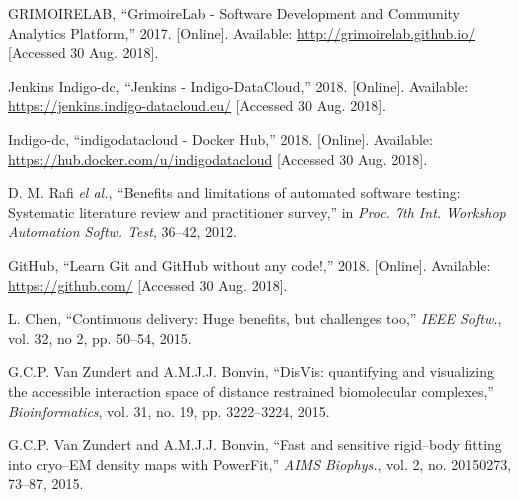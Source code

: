 \documentclass[journal]{IEEEtran}
\begin{document}
\begin{thebibliography}{1}
GRIMOIRELAB, ``GrimoireLab - Software Development and Community Analytics Platform,''
2017.
[Online]. Available: \url{http://grimoirelab.github.io/}
[Accessed 30 Aug. 2018].

Jenkins Indigo-dc, ``Jenkins - Indigo-DataCloud,''
2018.
[Online]. Available: \url{https://jenkins.indigo-datacloud.eu/}
[Accessed 30 Aug. 2018].

Indigo-dc, ``indigodatacloud - Docker Hub,''
2018.
[Online]. Available: \url{https://hub.docker.com/u/indigodatacloud}
[Accessed 30 Aug. 2018].

D. M. Rafi \emph{el al.},
``Benefits and limitations of automated software testing: Systematic literature review and practitioner survey,''
in \emph{Proc. 7th Int. Workshop Automation Softw. Test},
36--42, 2012.


GitHub, ``Learn Git and GitHub without any code!,''
2018.
[Online]. Available: \url{https://github.com/}
[Accessed 30 Aug. 2018].

L. Chen,
``Continuous delivery: Huge benefits, but challenges too,''
\emph{IEEE Softw.},
vol. 32, no 2, pp. 50--54, 2015.



G.C.P. Van Zundert and A.M.J.J. Bonvin,
``DisVis: quantifying and visualizing the accessible interaction space of distance
restrained biomolecular complexes,''
\emph{Bioinformatics}, vol. 31, no. 19, pp. 3222--3224, 2015.


G.C.P. Van Zundert and A.M.J.J. Bonvin,
``Fast and sensitive rigid--body fitting into cryo--EM density maps with PowerFit,''
\emph{AIMS Biophys.}, vol. 2, no. 20150273, 73--87, 2015.

\end{thebibliography}
\end{document}
